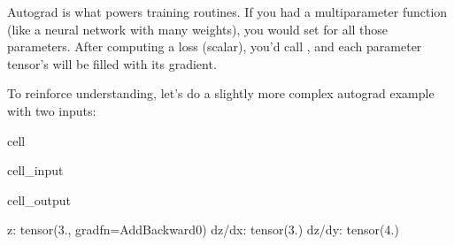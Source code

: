 \documentclass[letterpaper,10pt,english]{jupyterBook}
\begin{document}
\sphinxAtStartPar
Autograd is what powers training routines. If you had a multi\sphinxhyphen{}parameter function (like a neural network with many weights), you would set  for all those parameters. After computing a loss (scalar), you’d call , and each parameter tensor’s  will be filled with its gradient.

\sphinxAtStartPar
To reinforce understanding, let’s do a slightly more complex autograd example with two inputs:

\begin{sphinxuseclass}{cell}\begin{sphinxVerbatimInput}

\begin{sphinxuseclass}{cell_input}
\begin{sphinxVerbatim}[commandchars=\\\{\}]
   
   

         
 

  
    
    
\end{sphinxVerbatim}

\end{sphinxuseclass}\end{sphinxVerbatimInput}
\begin{sphinxVerbatimOutput}

\begin{sphinxuseclass}{cell_output}
\begin{sphinxVerbatim}[commandchars=\\\{\}]
z: tensor(3., grad\PYGZus{}fn=\PYGZlt{}AddBackward0\PYGZgt{})
dz/dx: tensor(\PYGZhy{}3.)
dz/dy: tensor(\PYGZhy{}4.)
\end{sphinxVerbatim}

\end{sphinxuseclass}\end{sphinxVerbatimOutput}

\end{sphinxuseclass}
\end{document}
